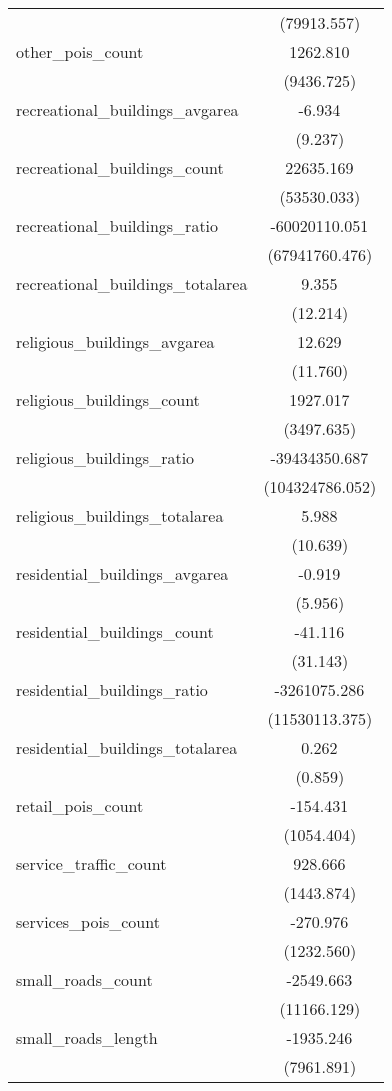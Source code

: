 \begin{table}[!htbp]
\begin{tabular}{@{\extracolsep{5pt}}lc}
  & (79913.557) \\
 other_pois_count & 1262.810$^{}$ \\
  & (9436.725) \\
 recreational_buildings_avgarea & -6.934$^{}$ \\
  & (9.237) \\
 recreational_buildings_count & 22635.169$^{}$ \\
  & (53530.033) \\
 recreational_buildings_ratio & -60020110.051$^{}$ \\
  & (67941760.476) \\
 recreational_buildings_totalarea & 9.355$^{}$ \\
  & (12.214) \\
 religious_buildings_avgarea & 12.629$^{}$ \\
  & (11.760) \\
 religious_buildings_count & 1927.017$^{}$ \\
  & (3497.635) \\
 religious_buildings_ratio & -39434350.687$^{}$ \\
  & (104324786.052) \\
 religious_buildings_totalarea & 5.988$^{}$ \\
  & (10.639) \\
 residential_buildings_avgarea & -0.919$^{}$ \\
  & (5.956) \\
 residential_buildings_count & -41.116$^{}$ \\
  & (31.143) \\
 residential_buildings_ratio & -3261075.286$^{}$ \\
  & (11530113.375) \\
 residential_buildings_totalarea & 0.262$^{}$ \\
  & (0.859) \\
 retail_pois_count & -154.431$^{}$ \\
  & (1054.404) \\
 service_traffic_count & 928.666$^{}$ \\
  & (1443.874) \\
 services_pois_count & -270.976$^{}$ \\
  & (1232.560) \\
 small_roads_count & -2549.663$^{}$ \\
  & (11166.129) \\
 small_roads_length & -1935.246$^{}$ \\
  & (7961.891) \\

\end{tabular}
\end{table}
